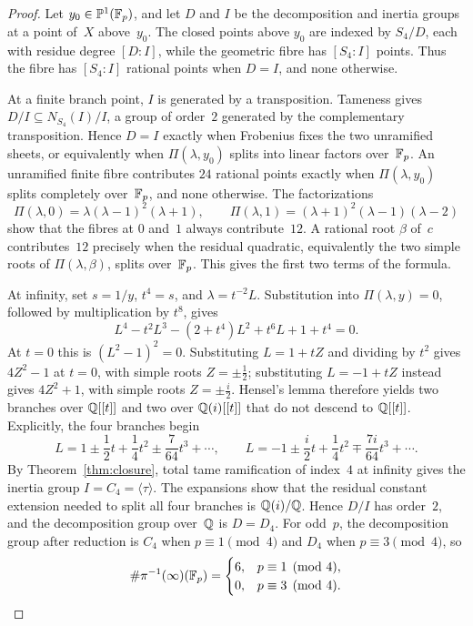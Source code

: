 \begin{proof}
Let \(y_0\in\mathbb{P}^1(\mathbb{F}_p)\), and let \(D\) and \(I\) be the decomposition and inertia groups at a point of~\(X\) above~\(y_0\). The closed points above \(y_0\) are indexed by \(S_4/D\), each with residue degree \([D:I]\), while the geometric fibre has \([S_4:I]\) points. Thus the fibre has \([S_4:I]\) rational points when \(D=I\), and none otherwise.

At a finite branch point, \(I\) is generated by a transposition. Tameness gives \(D/I\subseteq N_{S_4}(I)/I\), a group of order~\(2\) generated by the complementary transposition. Hence \(D=I\) exactly when Frobenius fixes the two unramified sheets, or equivalently when \(\Pi(\lambda,y_0)\) splits into linear factors over~\(\mathbb{F}_p\). An unramified finite fibre contributes \(24\) rational points exactly when \(\Pi(\lambda,y_0)\) splits completely over~\(\mathbb{F}_p\), and none otherwise. The factorizations
\[
\Pi(\lambda,0)=\lambda(\lambda-1)^2(\lambda+1),\qquad
\Pi(\lambda,1)=(\lambda+1)^2(\lambda-1)(\lambda-2)
\]
show that the fibres at \(0\) and~\(1\) always contribute~\(12\). A rational root \(\beta\) of~\(c\) contributes~\(12\) precisely when the residual quadratic, equivalently the two simple roots of \(\Pi(\lambda,\beta)\), splits over~\(\mathbb{F}_p\). This gives the first two terms of the formula.

At infinity, set \(s=1/y\), \(t^4=s\), and \(\lambda=t^{-2}L\). Substitution into \(\Pi(\lambda,y)=0\), followed by multiplication by \(t^8\), gives
\[
L^4-t^2L^3-(2+t^4)L^2+t^6L+1+t^4=0.
\]
At \(t=0\) this is \((L^2-1)^2=0\). Substituting \(L=1+tZ\) and dividing by \(t^2\) gives \(4Z^2-1\) at \(t=0\), with simple roots \(Z=\pm\tfrac12\); substituting \(L=-1+tZ\) instead gives \(4Z^2+1\), with simple roots \(Z=\pm\tfrac{i}{2}\). Hensel's lemma therefore yields two branches over \(\mathbb{Q}[[t]]\) and two over \(\mathbb{Q}(i)[[t]]\) that do not descend to \(\mathbb{Q}[[t]]\). Explicitly, the four branches begin
\[
L=1\pm\frac12t+\frac14t^2\pm\frac{7}{64}t^3+\cdots,
\qquad
L=-1\pm\frac{i}{2}t+\frac14t^2\mp\frac{7i}{64}t^3+\cdots.
\]
By Theorem~\ref{thm:closure}, total tame ramification of index~\(4\) at infinity gives the inertia group \(I=C_4=\langle\tau\rangle\). The expansions show that the residual constant extension needed to split all four branches is \(\mathbb{Q}(i)/\mathbb{Q}\). Hence \(D/I\) has order~\(2\), and the decomposition group over~\(\mathbb{Q}\) is \(D=D_4\). For odd~\(p\), the decomposition group after reduction is \(C_4\) when \(p\equiv1\pmod4\) and \(D_4\) when \(p\equiv3\pmod4\), so
\[
\#\pi^{-1}(\infty)(\mathbb{F}_p)=
\begin{cases}
6,&p\equiv1\pmod4,\\
0,&p\equiv3\pmod4.
\end{cases}
\]


\end{proof}
